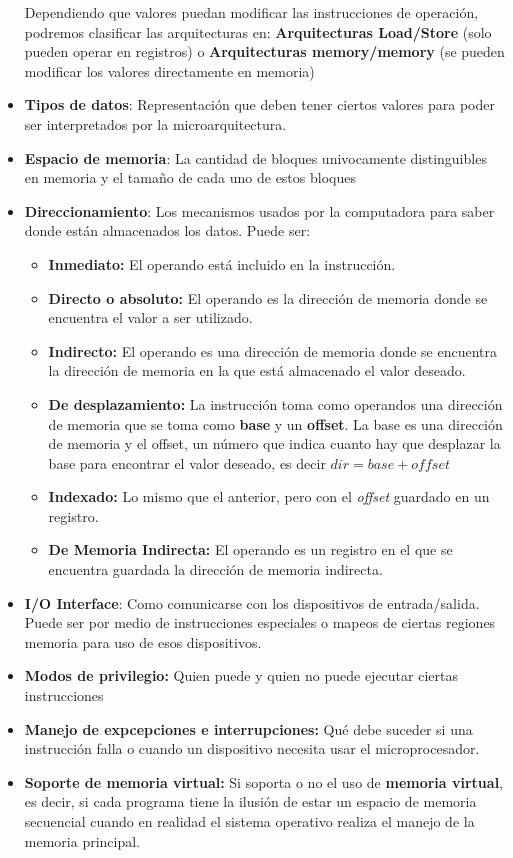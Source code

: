 \begin{itemize}
	Dependiendo que valores puedan modificar las instrucciones de operación, podremos clasificar las arquitecturas en: \textbf{Arquitecturas Load/Store} (solo pueden operar en registros) o \textbf{Arquitecturas memory/memory} (se pueden modificar los valores directamente en memoria)
	\item \textbf{Tipos de datos}: Representación que deben tener ciertos valores para poder ser interpretados por la microarquitectura.
	\item \textbf{Espacio de memoria}: La cantidad de bloques univocamente distinguibles en memoria y el tamaño de cada uno de estos bloques
	\item \textbf{Direccionamiento}: Los mecanismos usados por la computadora para saber donde están almacenados los datos. Puede ser:
	\begin{itemize}
		\item \textbf{Inmediato:} El operando está incluido en la instrucción.
		\item \textbf{Directo o absoluto:} El operando es la dirección de memoria donde se encuentra el valor a ser utilizado.
		\item \textbf{Indirecto:} El operando es una dirección de memoria donde se encuentra la dirección de memoria en la que está almacenado el valor deseado.
		\item \textbf{De desplazamiento:} La instrucción toma como operandos una dirección de memoria que se toma como \textbf{base} y un \textbf{offset}. La base es una dirección de memoria y el offset, un número que indica cuanto hay que desplazar la base para encontrar el valor deseado, es decir $dir = base + offset$
		\item \textbf{Indexado:} Lo mismo que el anterior, pero con el \textit{offset} guardado en un registro.
		\item \textbf{De Memoria Indirecta:} El operando es un registro en el que se encuentra guardada la dirección de memoria indirecta.
	\end{itemize}
	\item \textbf{I/O Interface}: Como comunicarse con los dispositivos de entrada/salida. Puede ser por medio de instrucciones especiales o mapeos de ciertas regiones memoria para uso de esos dispositivos.
	\item \textbf{Modos de privilegio:} Quien puede y quien no puede ejecutar ciertas instrucciones 
	\item \textbf{Manejo de expcepciones e interrupciones:} Qué debe suceder si una instrucción falla o cuando un dispositivo necesita usar el microprocesador.
	\item \textbf{Soporte de memoria virtual:} Si soporta o no el uso de \textbf{memoria virtual}, es decir, si cada programa tiene la ilusión de estar un espacio de memoria secuencial cuando en realidad el sistema operativo realiza el manejo de la memoria principal.
\end{itemize}

